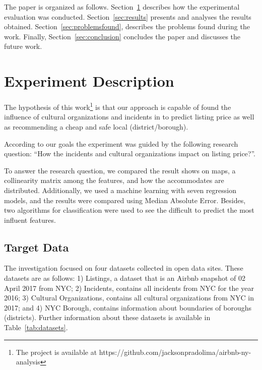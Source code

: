 \documentclass[sigconf]{acmart}
\begin{document}
The paper is organized as follows. Section~\ref{sec:experiment_description} describes how the experimental evaluation was conducted. Section~\ref{sec:results} presents and analyses the results obtained. Section~\ref{sec:problemsfound}, describes the problems found during the work. Finally, Section~\ref{sec:conclusion} concludes the paper and discusses the future work.

\section{Experiment Description}
\label{sec:experiment_description}

The hypothesis of this work\footnote{The project is available at https://github.com/jacksonpradolima/airbnb-ny-analysis} is that our approach is capable of found the influence of cultural organizations and incidents in to predict listing price as well as recommending a cheap and safe local (district/borough). 

According to our goals the experiment was guided by the following research question: ``How the incidents and cultural organizations impact on listing price?''.

To answer the research question, we compared the result shows on maps, a collinearity matrix among the features, and how the accommodates are distributed. Additionally, we used a machine learning with seven regression models, and the results were compared using Median Absolute Error. Besides, two algorithms for classification were used to see the difficult to predict the most influent features.

\subsection{Target Data}
\label{sec:experiment_description:target_data}

The investigation focused on four datasets collected in open data sites. These datasets are as follows: 1) Listings, a dataset that is an Airbnb snapshot of 02 April 2017 from NYC; 2) Incidents, contains all incidents from NYC for the year 2016; 3) Cultural Organizations, contains all cultural organizations from NYC in 2017; and 4) NYC Borough, contains information about boundaries of boroughs (districts). Further information about these datasets is available in Table~\ref{tab:datasets}.
\end{document}
